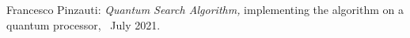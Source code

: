 \thispagestyle{empty}

\hfill

\vfill

\noindent Francesco Pinzauti: \textit{Quantum Search Algorithm,} implementing the algorithm on a quantum processor, \textcopyright\ July 2021.